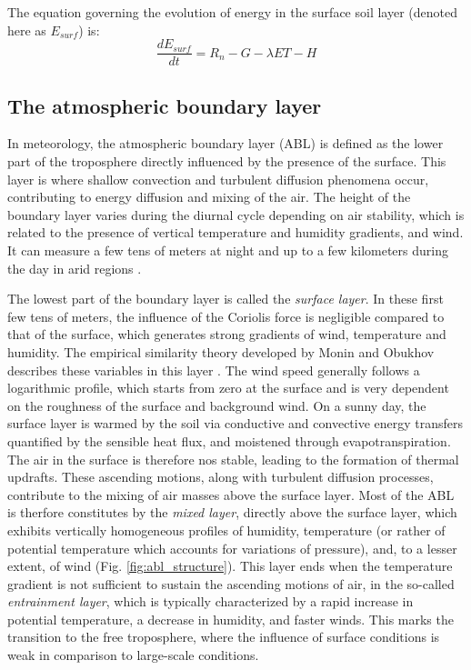 The equation governing the evolution of energy in the surface soil layer (denoted here as $E_{surf}$)  is:
\begin{equation}
    \frac{dE_{surf}}{dt} = R_{n} - G - \lambda ET - H
\end{equation}

\subsection{The atmospheric boundary layer}

In meteorology, the atmospheric boundary layer (ABL) is defined as the lower part of the troposphere directly influenced by the presence of the surface. This layer is where shallow convection and turbulent diffusion phenomena occur, contributing to energy diffusion and mixing of the air.
The height of the boundary layer varies during the diurnal cycle depending on air stability, which is related to the presence of vertical temperature and humidity gradients, and wind. It can measure a few tens of meters at night and up to a few kilometers during the day in arid regions \citep{garratt_review_1994}.

The lowest part of the boundary layer is called the \textit{surface layer}. 
In these first few tens of meters, the influence of the Coriolis force is negligible compared to that of the surface, which generates strong gradients of wind, temperature and humidity. The empirical similarity theory developed by Monin and Obukhov describes these variables in this layer \citep{monin1954osnovnye}. 
The wind speed generally follows a logarithmic profile, which starts from zero at the surface and is very dependent on the roughness of the surface and background wind.
On a sunny day, the surface layer is warmed by the soil via conductive and convective energy transfers quantified by the sensible heat flux, and moistened through evapotranspiration. The air in the surface is therefore nos stable, leading to the formation of thermal updrafts. 
These ascending motions, along with turbulent diffusion processes, contribute to the mixing of air masses above the surface layer. Most of the ABL is therfore constitutes by the \textit{mixed layer}, directly above the surface layer, which exhibits vertically homogeneous profiles of humidity, temperature (or rather of potential temperature which accounts for variations of pressure), and, to a lesser extent, of wind (Fig. \ref{fig:abl_structure}).
This layer ends when the temperature gradient is not sufficient to sustain the ascending motions of air, in the so-called \textit{entrainment layer}, which is typically characterized by a rapid increase in potential temperature, a decrease in humidity, and faster winds.
This marks the transition to the free troposphere, where the influence of surface conditions is weak in comparison to large-scale conditions.


